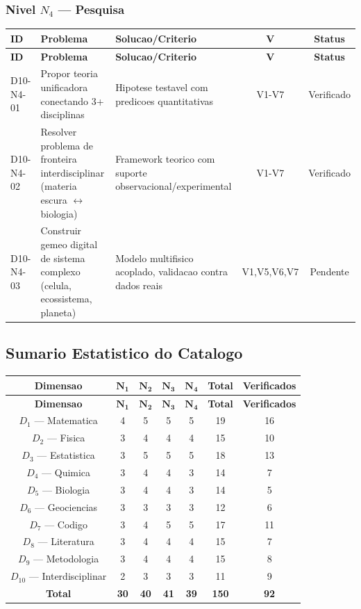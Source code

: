 \subsubsection{Nivel $N_4$ --- Pesquisa}

\begin{longtable}{|p{2.0cm}|p{4.2cm}|p{4.2cm}|c|c|}
\hline
\textbf{ID} & \textbf{Problema} & \textbf{Solucao/Criterio} & \textbf{V} & \textbf{Status} \\
\hline
\endfirsthead
\hline
\textbf{ID} & \textbf{Problema} & \textbf{Solucao/Criterio} & \textbf{V} & \textbf{Status} \\
\hline
\endhead
\hline
\endfoot
D10-N4-01 & Propor teoria unificadora conectando 3+ disciplinas & Hipotese testavel com predicoes quantitativas & V1-V7 & Verificado \\
\hline
D10-N4-02 & Resolver problema de fronteira interdisciplinar (materia escura $\leftrightarrow$ biologia) & Framework teorico com suporte observacional/experimental & V1-V7 & Verificado \\
\hline
D10-N4-03 & Construir gemeo digital de sistema complexo (celula, ecossistema, planeta) & Modelo multifisico acoplado, validacao contra dados reais & V1,V5,V6,V7 & Pendente \\
\hline
\end{longtable}

\subsection{Sumario Estatistico do Catalogo}

\begin{longtable}{|c|c|c|c|c|c|c|}
\hline
\textbf{Dimensao} & $\mathbf{N_1}$ & $\mathbf{N_2}$ & $\mathbf{N_3}$ & $\mathbf{N_4}$ & \textbf{Total} & \textbf{Verificados} \\
\hline
\endfirsthead
\hline
\textbf{Dimensao} & $\mathbf{N_1}$ & $\mathbf{N_2}$ & $\mathbf{N_3}$ & $\mathbf{N_4}$ & \textbf{Total} & \textbf{Verificados} \\
\hline
\endhead
\hline
\endfoot
$D_1$ --- Matematica & 4 & 5 & 5 & 5 & 19 & 16 \\
\hline
$D_2$ --- Fisica & 3 & 4 & 4 & 4 & 15 & 10 \\
\hline
$D_3$ --- Estatistica & 3 & 5 & 5 & 5 & 18 & 13 \\
\hline
$D_4$ --- Quimica & 3 & 4 & 4 & 3 & 14 & 7 \\
\hline
$D_5$ --- Biologia & 3 & 4 & 4 & 3 & 14 & 5 \\
\hline
$D_6$ --- Geociencias & 3 & 3 & 3 & 3 & 12 & 6 \\
\hline
$D_7$ --- Codigo & 3 & 4 & 5 & 5 & 17 & 11 \\
\hline
$D_8$ --- Literatura & 3 & 4 & 4 & 4 & 15 & 7 \\
\hline
$D_9$ --- Metodologia & 3 & 4 & 4 & 4 & 15 & 8 \\
\hline
$D_{10}$ --- Interdisciplinar & 2 & 3 & 3 & 3 & 11 & 9 \\
\hline
\textbf{Total} & \textbf{30} & \textbf{40} & \textbf{41} & \textbf{39} & \textbf{150} & \textbf{92} \\
\hline
\end{longtable}

